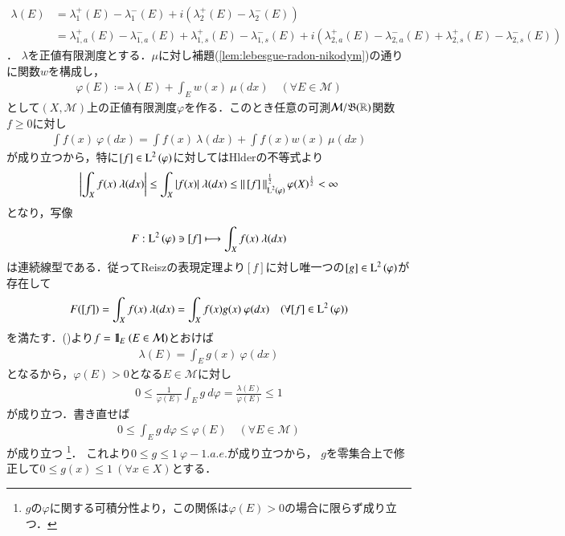 \begin{prf}
\begin{description}
{			\begin{align}
				\lambda(E) 
				&= \lambda_1^+(E) - \lambda_1^-(E) + i\left( \lambda_2^+(E) - \lambda_2^-(E) \right) \\
				&= \lambda_{1,a}^+(E) - \lambda_{1,a}^-(E) + \lambda_{1,s}^+(E) - \lambda_{1,s}^-(E) 
					+ i\left( \lambda_{2,a}^+(E) - \lambda_{2,a}^-(E) + \lambda_{2,s}^+(E) - \lambda_{2,s}^-(E) \right)
			\end{align}
		}．
		$\lambda$を正値有限測度とする．$\mu$に対し補題(\ref{lem:lebesgue-radon-nikodym})の通りに関数$w$を構成し，
		\begin{align}
			\varphi(E) \coloneqq \lambda(E) + \int_E w(x)\ \mu(dx) \quad (\forall E \in \mathcal{M})
		\end{align}
		として$(X,\mathcal{M})$上の正値有限測度$\varphi$を作る．このとき任意の可測$\mathcal{M}/\mathfrak{B}(\mathbb{R})$関数$f \geq 0$に対し
		\begin{align}
			\int f(x)\ \varphi(dx) = \int f(x)\ \lambda(dx) + \int f(x)w(x)\ \mu(dx)
			\label{eq:lebesgue_radon_nikodym}
		\end{align}
		が成り立つから，特に$[f] \in \operatorname{L}^{2} \left(\varphi\right)$に対してはHlderの不等式より
		\begin{align}
			\left| \int_X f(x)\ \lambda(dx) \right| \leq \int_X |f(x)|\ \lambda(dx) \leq \Norm{[f]}{\Lp{2}{\varphi}}^{\frac{1}{2}} \varphi(X)^{\frac{1}{2}} < \infty
		\end{align}
		となり，写像
		\begin{align}
			F:\Lp{2}{\varphi} \ni [f] \longmapsto \int_X f(x)\ \lambda(dx)
		\end{align}
		は連続線型である．従ってReiszの表現定理より$[f]$に対し唯一つの$[g] \in \operatorname{L}^{2} \left(\varphi\right)$が存在して
		\begin{align}
			F([f]) = \int_X f(x)\ \lambda(dx) = \int_X f(x)g(x)\ \varphi(dx) \quad (\forall [f] \in \Lp{2}{\varphi})
			\label{eq:lebesgue_radon_nikodym_2}
		\end{align}
		を満たす．()より$f = \mbox{1}\hspace{-0.25em}\mbox{l}_E\ (E \in \mathcal{M})$とおけば
		\begin{align}
			\lambda(E) = \int_E g(x)\ \varphi(dx)
		\end{align}
		となるから，$\varphi(E) > 0$となる$E \in \mathcal{M}$に対し
		\begin{align}
			0 \leq \frac{1}{\varphi(E)} \int_E g\ d\varphi = \frac{\lambda(E)}{\varphi(E)} \leq 1
		\end{align}
		が成り立つ．書き直せば
		\begin{align}
			0 \leq \int_E g\ d\varphi \leq \varphi(E) \quad (\forall E \in \mathcal{M})
		\end{align}
		が成り立つ
		\footnote{
			$g$の$\varphi$に関する可積分性より，この関係は$\varphi(E) > 0$の場合に限らず成り立つ．
		}．
		これより$0 \leq g \leq 1\ \varphi-1.a.e.$が成り立つから，
		$g$を零集合上で修正して$0 \leq g(x) \leq 1\ (\forall x \in X)$とする．
		

\end{description}
\end{prf}
